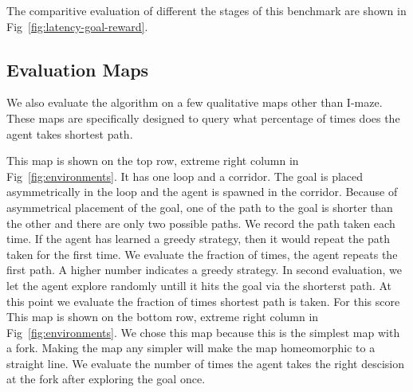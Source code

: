 The comparitive evaluation of different the stages of this benchmark are shown in Fig~\ref{fig:latency-goal-reward}.

\subsection{Evaluation Maps}
We also evaluate the algorithm on a few qualitative maps other than I-maze. These maps are specifically designed to query what percentage of times does the agent takes shortest path.

\setcounter{Benchmark}{0}
\begin{description}
    This map is shown on the top row, extreme right column in Fig~\ref{fig:environments}. It has one loop and a corridor.
    The goal is placed asymmetrically in the loop and the agent is spawned in the corridor.
    Because of asymmetrical placement of the goal, one of the path to the goal is shorter than the other and there are only two possible paths.
    We record the path taken each time. If the agent has learned a greedy strategy, then it would repeat the path taken for the first time.
    We evaluate the fraction of times, the agent repeats the first path. A higher number indicates a greedy strategy.
    In second evaluation, we let the agent explore randomly untill it hits the goal via the shorterst path.
    At this point we evaluate the  fraction of times shortest path is taken. For this score 
    This map is shown on the bottom row, extreme right column in Fig~\ref{fig:environments}.
    We chose this map because this is the simplest map with a fork. Making the map any simpler will make the map homeomorphic to a straight line. 
    We evaluate the number of times the agent takes the right descision at the fork after exploring the goal once.
\end{description}

